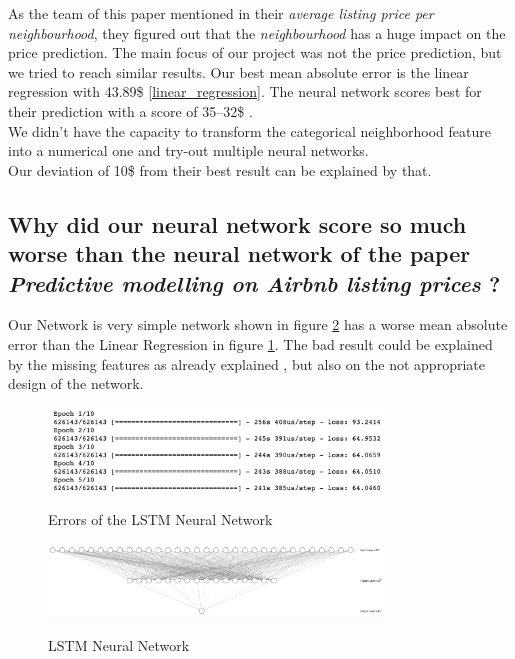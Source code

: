 \documentclass[journal]{IEEEtran}
\begin{document}
As the team of this paper \cite{RN1} mentioned in their \textit{average listing price per neighbourhood}, they figured out that the \textit{neighbourhood} has a huge impact on the price prediction. The main focus of our project was not the price prediction, but we tried to reach similar results. Our best mean absolute error is the linear regression with 43.89\$ \ref{linear_regression}. The neural network scores best for their prediction with a score of 35–32\$ \cite{RN1}. \\
We didn't have the capacity to transform the categorical neighborhood feature into a numerical one and try-out multiple neural networks. \\
Our deviation of 10\$ from their best result can be explained by that.

\subsection{Why did our neural network score so much worse than the neural network of the paper \textit{Predictive modelling on Airbnb listing prices} \cite{RN1}?}
Our Network is very simple network shown in figure \ref{lstm} has a worse mean absolute error than the Linear Regression in figure \ref{nn}. 
The bad result could be explained by the missing features as already explained \cite{RN1}, but also on the not appropriate design of the network.

\begin{figure}
  \begin{center}
  \includegraphics[width=3.5in]{photo/lstm.png}\\
  \caption{Errors of the LSTM Neural Network}\label{nn}
  \end{center}
\end{figure}
\begin{figure}
  \begin{center}
  \includegraphics[width=3.5in]{photo/nn.png}\\
  \caption{LSTM Neural Network}\label{lstm}
  \end{center}
\end{figure}
\end{document}
